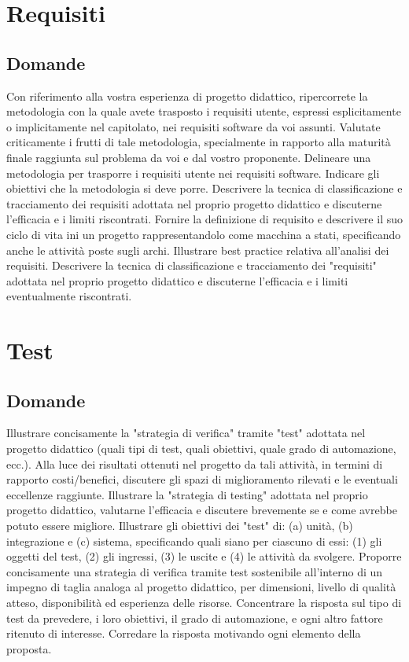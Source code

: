 \section{Requisiti}

\subsection*{Domande}
Con riferimento alla vostra esperienza di progetto didattico, ripercorrete la metodologia con la quale avete trasposto i requisiti utente, espressi esplicitamente o implicitamente nel capitolato, nei requisiti software da voi assunti. Valutate criticamente i frutti di tale metodologia, specialmente in rapporto alla maturità finale raggiunta sul problema da voi e dal vostro proponente.
Delineare una metodologia per trasporre i requisiti utente nei requisiti software. Indicare gli obiettivi che la metodologia si deve porre.
Descrivere la tecnica di classificazione e tracciamento dei requisiti adottata nel proprio progetto didattico e discuterne l'efficacia e i limiti riscontrati.
Fornire la definizione di requisito e descrivere il suo ciclo di vita ini un progetto rappresentandolo come macchina a stati, specificando anche le attività poste sugli archi.
Illustrare best practice relativa all'analisi dei requisiti.
Descrivere la tecnica di classificazione e tracciamento dei "requisiti" adottata nel proprio progetto didattico e discuterne l'efficacia e i limiti eventualmente riscontrati.

\section{Test}

\subsection*{Domande}
Illustrare concisamente la "strategia di verifica" tramite "test" adottata nel progetto didattico (quali tipi di test, quali obiettivi, quale grado di automazione, ecc.). Alla luce dei risultati ottenuti nel progetto da tali attività, in termini di rapporto costi/benefici, discutere gli spazi di miglioramento rilevati e le eventuali eccellenze raggiunte.
Illustrare la "strategia di testing" adottata nel proprio progetto didattico, valutarne l'efficacia e discutere brevemente se e come avrebbe potuto essere migliore.
Illustrare gli obiettivi dei "test" di: (a) unità, (b) integrazione e (c) sistema, specificando quali siano per ciascuno di essi: (1) gli oggetti del test, (2) gli ingressi, (3) le uscite e (4) le attività da svolgere.
Proporre concisamente una strategia di verifica tramite test sostenibile all'interno di un impegno di taglia analoga al progetto didattico, per dimensioni, livello di qualità atteso, disponibilità ed esperienza delle risorse. Concentrare la risposta sul tipo di test da prevedere, i loro obiettivi, il grado di automazione, e ogni altro fattore ritenuto di interesse. Corredare la risposta motivando ogni elemento della proposta.

